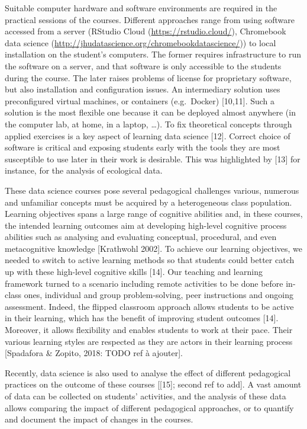 \documentclass{aims}
\theoremstyle{definition}
\begin{document}
Suitable computer hardware and software environments are required in the
practical sessions of the courses. Different approaches range from using
software accessed from a server (RStudio Cloud
(\url{https://rstudio.cloud/}), Chromebook data science
(\url{http://jhudatascience.org/chromebookdatascience/})) to local
installation on the student's computers. The former requires
infrastructure to run the software on a server, and that software is
only accessible to the students during the course. The later raises
problems of license for proprietary software, but also installation and
configuration issues. An intermediary solution uses preconfigured
virtual machines, or containers (e.g.~Docker) {[}10,11{]}. Such a
solution is the most flexible one because it can be deployed almost
anywhere (in the computer lab, at home, in a laptop, \ldots). To fix
theoretical concepts through applied exercises is a key aspect of
learning data science {[}12{]}. Correct choice of software is critical
and exposing students early with the tools they are most susceptible to
use later in their work is desirable. This was highlighted by {[}13{]}
for instance, for the analysis of ecological data.

These data science courses pose several pedagogical challenges various,
numerous and unfamiliar concepts must be acquired by a heterogeneous
class population. Learning objectives spans a large range of cognitive
abilities and, in these courses, the intended learning outcomes aim at
developing high-level cognitive process abilities such as analysing and
evaluating conceptual, procedural, and even metacognitive knowledge
{[}Krathwohl 2002{]}. To achieve our learning objectives, we needed to
switch to active learning methods so that students could better catch up
with these high-level cognitive skills {[}14{]}. Our teaching and
learning framework turned to a scenario including remote activities to
be done before in-class ones, individual and group problem-solving, peer
instructions and ongoing assessment. Indeed, the flipped classroom
approach allows students to be active in their learning, which has the
benefit of improving student outcomes {[}14{]}. Moreover, it allows
flexibility and enables students to work at their pace. Their various
learning styles are respected as they are actors in their learning
process {[}Spadafora \& Zopito, 2018: TODO ref à ajouter{]}.

Recently, data science is also used to analyse the effect of different
pedagogical practices on the outcome of these courses {[}{[}15{]};
second ref to add{]}. A vast amount of data can be collected on
students' activities, and the analysis of these data allows comparing
the impact of different pedagogical approaches, or to quantify and
document the impact of changes in the courses.
\end{document}
